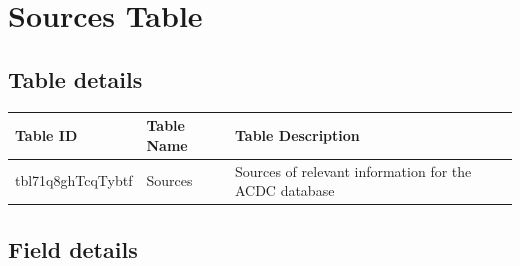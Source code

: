 \documentclass[
]{book}
\begin{document}
\hypertarget{sources-table}{%
\section{Sources Table}\label{sources-table}}

\hypertarget{table-details-7}{%
\subsection{Table details}\label{table-details-7}}

\begin{table}
\centering
\begin{tabular}{l|l|l}
\hline
\textbf{Table ID} & \textbf{Table Name} & \textbf{Table Description}\\
\hline
tbl71q8ghTcqTybtf & Sources & Sources of relevant information for the ACDC database\\
\hline
\end{tabular}
\end{table}

\hypertarget{field-details-4}{%
\subsection{Field details}\label{field-details-4}}
\end{document}
